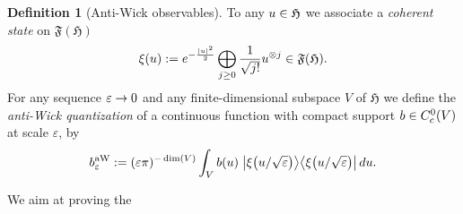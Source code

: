 \documentclass[10pt]{amsart}
\theoremstyle{definition}\newtheorem{defi}[theo]{Definition}\newtheorem{rema}[theo]{Remark}\newtheorem{exam}[theo]{Example}\newtheorem{exem}[theo]{Example}\newtheorem{nota}[theo]{Notation}
\newcommand{\gH}{\mathfrak{H}}
\newcommand{\gF}{\mathfrak{F}}
\newcommand{\1}{\mathds{1}}
\newcommand{\eps}{\varepsilon}
\let\oldin\in
\renewcommand{\in}{\mathchoice{\oldin}{\oldin}{\,\oldin\,}{\,\oldin\,}}
\renewcommand*{\to}{\mathchoice{\longrightarrow}{\rightarrow}{\rightarrow}{\rightarrow}}
\let\originalleft\left
\let\originalright\right
\renewcommand{\left}{\mathopen{}\mathclose\bgroup\originalleft}
\renewcommand{\right}{\aftergroup\egroup\originalright}
\begin{document}
\begin{defi}[{Anti-Wick observables}]\label{def:a-Wick}
To any $u\in \gH$ we associate a \emph{coherent state} on $\gF(\gH)$
\begin{equation}
\xi(u):=e^{-\frac{|u|^2}{2}} \bigoplus_{j \ge 0} \frac{1}{\sqrt{j!}} u^{\otimes j}\in\gF(\gH).\label{eq:def_coherent}
\end{equation}
For any sequence $\eps\to0$ and any finite-dimensional subspace $V$ of $\gH$ we define the \emph{anti-Wick quantization} of a continuous function with compact support $b\in C^0_c(V)$ at scale $\eps$, by
\begin{equation}\label{eq:def_quantization_b}
b^{\rm aW}_{\eps}:=(\eps\pi)^{-\dim(V)}\int_{V} b(u)\;\left|\xi\left(u/\sqrt{\eps}\right)\right\rangle\left\langle\xi\left(u/\sqrt{\eps}\right)\right|\, du.
\end{equation}
\end{defi}

We aim at proving the
\end{document}
